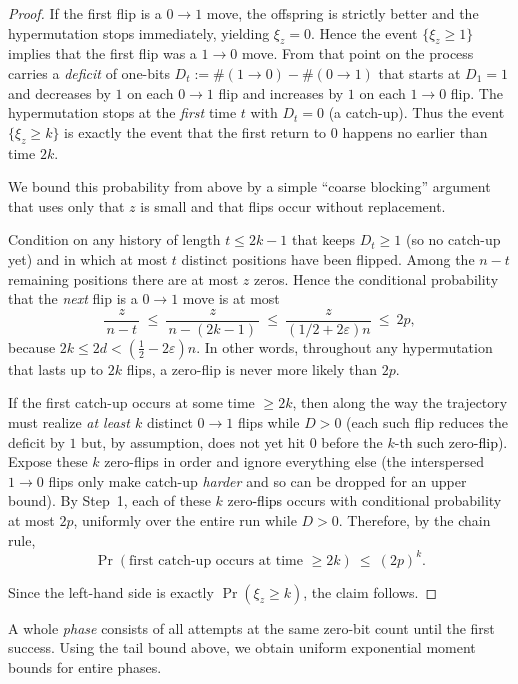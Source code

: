 \documentclass[lettersize,journal]{IEEEtran}
\newcommand{\new}[1]{\textcolor{black}{#1}}
\begin{document}
{\begin{proof}
	If the first flip is a $0\!\to 1$ move, the offspring is strictly better and the hypermutation stops immediately, yielding $\xi_z=0$. Hence the event $\{\xi_z\ge 1\}$ implies that the first flip was a $1\!\to 0$ move. From that point on the process carries a \emph{deficit} of one-bits $D_t:=\#(1\!\to 0)-\#(0\!\to 1)$ that starts at $D_1=1$ and decreases by $1$ on each $0\!\to 1$ flip and increases by $1$ on each $1\!\to 0$ flip. The hypermutation stops at the \emph{first} time $t$ with $D_t=0$ (a catch-up). Thus the event $\{\xi_z\ge k\}$ is exactly the event that the first return to $0$ happens no earlier than time $2k$.
	
	We bound this probability from above by a simple ``coarse blocking'' argument that uses only that $z$ is small and that flips occur without replacement.
	
	\smallskip
	Condition on any history of length $t\le 2k-1$ that keeps $D_t\ge 1$ (so no catch-up yet) and in which at most $t$ distinct positions have been flipped. Among the $n-t$ remaining positions there are at most $z$ zeros. Hence the conditional probability that the \emph{next} flip is a $0\!\to 1$ move is at most
	\[
	\frac{z}{\,n-t\,}\ \le\ \frac{z}{\,n-(2k-1)\,}\ \le\ \frac{z}{(1/2+2\varepsilon)n}\ \le\ 2p,
	\]
	because $2k\le 2d<(\tfrac12-2\varepsilon)n$. In other words, throughout any hypermutation that lasts up to $2k$ flips, a zero-flip is never more likely than $2p$.
	
	\smallskip
	If the first catch-up occurs at some time $\ge 2k$, then along the way the trajectory must realize \emph{at least $k$} distinct $0\!\to 1$ flips while $D>0$ (each such flip reduces the deficit by $1$ but, by assumption, does not yet hit $0$ before the $k$-th such zero\new{-flip}). Expose these $k$ zero-flips in order and ignore everything else (the interspersed $1\!\to 0$ flips only make catch-up \emph{harder} and so can be dropped for an upper bound). By Step~1, each of these $k$ zero\new{-flips} occurs with conditional probability at most $2p$, uniformly over the entire run while $D>0$. Therefore, by the chain rule,
	\[
	\Pr(\text{first catch-up occurs at time }\ge 2k)\ \le\ (2p)^k.
	\]
	
	
	Since the left-hand side is exactly $\Pr(\xi_z\ge k)$, the claim follows.
\end{proof}


A whole \emph{phase} consists of all attempts at the same zero-bit count until the 
first success.  
Using the tail bound above, we obtain uniform exponential moment bounds for 
entire phases.

}
\end{document}
